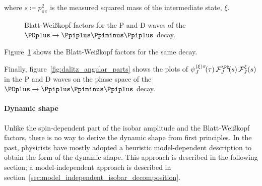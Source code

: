     where $s \coloneqq p_{\pi\pi}^2$ is the measured squared mass of the intermediate state, $\xi$.
    \begin{figure}
        \centering
        \subfloat[][P wave.]{}

        \subfloat[][D wave.]{}

        \caption{Blatt-Wei\ss{}kopf factors for the P and D waves of the $\PDplus\to\Ppiplus\Ppiminus\Ppiplus$ decay.}
        \label{fig:blatt_weisskopf}
    \end{figure}
    Figure~\ref{fig:blatt_weisskopf} shows the Blatt-Wei\ss{}kopf factors for the same decay.


    Finally, figure~\ref{fig:dalitz_angular_parts} shows the plots of $\psi_J^{(\xi)\pi}\!(\tau)\,\mathcal{F}_J^{\PD}\!(s)\,\mathcal{F}_J^{\xi}(s)$ in the P and D waves on the phase space of the $\PDplus\to\Ppiplus\Ppiminus\Ppiplus$ decay.

    \paragraph{Dynamic shape}
    Unlike the spin-dependent part of the isobar amplitude and the Blatt-Wei\ss{}kopf factors, there is no way to derive the dynamic shape from first principles.
    In the past, physicists have mostly adopted a heuristic model-dependent description to obtain the form of the dynamic shape.
    This approach is described in the following section; a model-independent approach is described in section~\ref{sec:model_independent_isobar_decomposition}.


    
    
